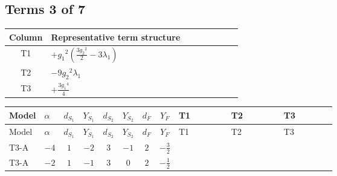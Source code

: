 \documentclass[8pt]{article}
\begin{document}
\begin{landscape}
\subsection*{Terms 3 of 7}
\begin{center}
\begin{tabular}{@{}c >{\raggedright\arraybackslash}p{0.82\linewidth}@{}}
\toprule
Column & Representative term structure \\
\midrule
T1 & \(\displaystyle +{g_1}^2 \left(\frac{3 {g_2}^2}{2}-3 {\lambda_1}\right)\) \\
\midrule
T2 & \(\displaystyle -9 {g_2}^2 {\lambda_1}\) \\
\midrule
T3 & \(\displaystyle +\frac{3 {g_1}^4}{4}\) \\
\midrule
\bottomrule
\end{tabular}
\end{center}
\smallskip
\tiny
\begin{longtable}{@{}llcccccc >{\raggedright\arraybackslash}p{0.21\linewidth} >{\raggedright\arraybackslash}p{0.21\linewidth} >{\raggedright\arraybackslash}p{0.21\linewidth}@{}}
\toprule
Model & $\alpha$ & $d_{S_1}$ & $Y_{S_1}$ & $d_{S_2}$ & $Y_{S_2}$ & $d_F$ & $Y_F$ & T1 & T2 & T3 \\
\midrule
\endfirsthead
\toprule
Model & $\alpha$ & $d_{S_1}$ & $Y_{S_1}$ & $d_{S_2}$ & $Y_{S_2}$ & $d_F$ & $Y_F$ & T1 & T2 & T3 \\
\midrule
\endhead
T3-A & $-4$ & $1$ & $-2$ & $3$ & $-1$ & $2$ & $-\frac{3}{2}$ & \scriptsize\adjustbox{max width=\linewidth}{$\begin{gathered} +{g_1}^2 \left(\frac{3 {g_2}^2}{2}-3 {\lambda_1}\right)\end{gathered}$} & \scriptsize\adjustbox{max width=\linewidth}{$\begin{gathered} -9 {g_2}^2 {\lambda_1}\end{gathered}$} & \scriptsize\adjustbox{max width=\linewidth}{$\begin{gathered} +\frac{3 {g_1}^4}{4}\end{gathered}$} \\
\midrule
T3-A & $-2$ & $1$ & $-1$ & $3$ & $0$ & $2$ & $-\frac{1}{2}$ & \scriptsize\adjustbox{max width=\linewidth}{$\begin{gathered} +{g_1}^2 \left(\frac{3 {g_2}^2}{2}-3 {\lambda_1}\right)\end{gathered}$} & \scriptsize\adjustbox{max width=\linewidth}{$\begin{gathered} -9 {g_2}^2 {\lambda_1}\end{gathered}$} & \scriptsize\adjustbox{max width=\linewidth}{$\begin{gathered} +\frac{3 {g_1}^4}{4}\end{gathered}$} \\

\end{longtable}
\end{landscape}
\end{document}
